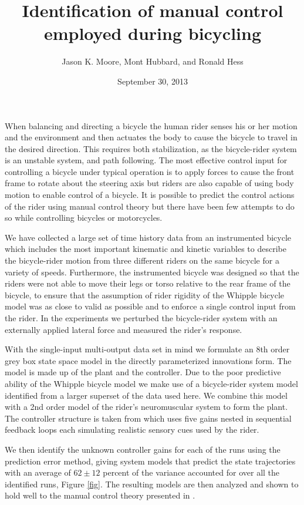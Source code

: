 \documentclass[a4paper]{article}
\title{Identification of manual control employed during bicycling}
\author{Jason K. Moore, Mont Hubbard, and Ronald Hess}
\date{September 30, 2013}
\begin{document}
\maketitle

When balancing and directing a bicycle the human rider senses his or her motion
and the environment and then actuates the body to cause the bicycle to travel
in the desired direction. This requires both stabilization, as the
bicycle-rider system is an unstable system, and path following. The most
effective control input for controlling a bicycle under typical operation is to
apply forces to cause the front frame to rotate about the steering axis but
riders are also capable of using body motion to enable control of a bicycle.
It is possible to predict the control actions of the rider using manual control
theory but there have been few attempts to do so while controlling bicycles or
motorcycles.

We have collected a large set of time history data from an instrumented bicycle
which includes the most important kinematic and kinetic variables to describe
the bicycle-rider motion from three different riders on the same bicycle for a
variety of speeds. Furthermore, the instrumented bicycle was designed so that
the riders were not able to move their legs or torso relative to the rear frame
of the bicycle, to ensure that the assumption of rider rigidity of the Whipple
bicycle model was as close to valid as possible and to enforce a single control
input from the rider. In the experiments we perturbed the bicycle-rider system
with an externally applied lateral force and measured the rider's response.

With the single-input multi-output data set in mind we formulate an 8th order
grey box state space model \cite{Ljung1999} in the directly parameterized
innovations form. The model is made up of the plant and the controller. Due to
the poor predictive ability of the Whipple bicycle model we make use of a
bicycle-rider system model identified from a larger superset of the data used
here. We combine this model with a 2nd order model of the rider's neuromuscular
system to form the plant. The controller structure is taken from
\cite{Hess2012} which uses five gains nested in sequential feedback loops each
simulating realistic sensory cues used by the rider.

We then identify the unknown controller gains for each of the runs using the
prediction error method, giving system models that predict the state
trajectories with an average of $62 \pm 12$ percent of the variance accounted
for over all the identified runs, Figure \ref{fig}. The resulting models are
then analyzed and shown to hold well to the manual control theory presented in
\cite{Hess2012}.
\end{document}
